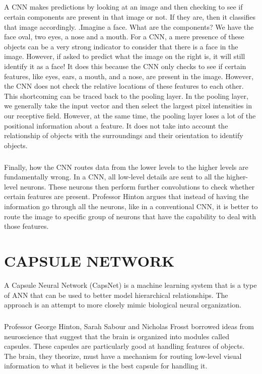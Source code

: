 \documentclass[a4paper,12pt]{report}
\begin{document}
\paragraph{}
A CNN makes predictions by looking at an image and then checking to see if certain components are present in that image or not. If they are, then it classifies that image accordingly. .Imagine a face. What are the components? We have the face oval, two eyes, a nose and a mouth. For a CNN, a mere presence of these objects can be a very strong indicator to consider that there is a face in the image. However, if asked to predict what the image on the right is, it will still identify it as a face! It does this because the CNN only checks to see if certain features, like eyes, ears, a mouth, and a nose, are present in the image. However, the CNN does not check the relative locations of these features to each other. This shortcoming can be traced back to the pooling layer. In the pooling layer, we generally take the input vector and then select the largest pixel intensities in our receptive field. However, at the same time, the pooling layer loses a lot of the positional information about a feature.  It does not take into account the relationship of objects with the surroundings and their orientation to identify objects. 

\paragraph{}
Finally, how the CNN routes data from the lower levels to the higher levels are fundamentally wrong. In a CNN, all low-level details are sent to all the higher-level neurons. These neurons then perform further convolutions to check whether certain features are present. Professor Hinton argues that instead of having the information go through all the neurons, like in a conventional CNN, it is better to route the image to specific group of neurons that have the capability to deal with those features.  

\newpage
\renewcommand\chaptername{CHAPTER}
\chapter{CAPSULE NETWORK}
A Capsule Neural Network (CapsNet) is a machine learning system that is a type of ANN that can be used to better model hierarchical relationships. The approach is an attempt to more closely mimic biological neural organization.

\paragraph{}
Professor George Hinton, Sarah Sabour and Nicholas Frosst borrowed ideas from neuroscience that suggest that the brain is organized into modules called capsules. These capsules are particularly good at handling features of objects.
The brain, they theorize, must have a mechanism for routing low-level visual information to what it believes is the best capsule for handling it.
\end{document}
